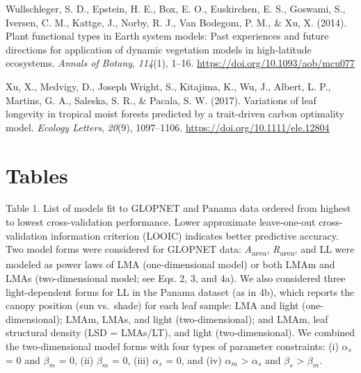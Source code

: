 \documentclass[
  12pt,
  letterpaper,
  DIV=11,
  numbers=noendperiod]{scrartcl}
\newlength{\cslhangindent}
\newlength{\cslentryspacingunit} %
\newenvironment{CSLReferences}[2] %
 {%
  \setlength{\parindent}{0pt}
  \ifodd #1
  \let\oldpar\par
  \def\par{\hangindent=\cslhangindent\oldpar}
  \fi
  \setlength{\parskip}{#2\cslentryspacingunit}
 }%
 {}
\begin{document}
\begin{CSLReferences}{1}{0}
\leavevmode{}%
Wullschleger, S. D., Epstein, H. E., Box, E. O., Euskirchen, E. S.,
Goswami, S., Iversen, C. M., Kattge, J., Norby, R. J., Van Bodegom, P.
M., \& Xu, X. (2014). Plant functional types in {Earth} system models:
{Past} experiences and future directions for application of dynamic
vegetation models in high-latitude ecosystems. \emph{Annals of Botany},
\emph{114}(1), 1--16. \url{https://doi.org/10.1093/aob/mcu077}

\leavevmode{}%
Xu, X., Medvigy, D., Joseph Wright, S., Kitajima, K., Wu, J., Albert, L.
P., Martins, G. A., Saleska, S. R., \& Pacala, S. W. (2017). Variations
of leaf longevity in tropical moist forests predicted by a trait-driven
carbon optimality model. \emph{Ecology Letters}, \emph{20}(9),
1097--1106. \url{https://doi.org/10.1111/ele.12804}

\end{CSLReferences}

\newpage

\hypertarget{tables}{%
\section{Tables}\label{tables}}

Table 1. List of models fit to GLOPNET and Panama data ordered from
highest to lowest cross-validation performance. Lower approximate
leave-one-out cross-validation information criterion (LOOIC) indicates
better predictive accuracy. Two model forms were considered for GLOPNET
data: \emph{A}\textsubscript{area}, \emph{R}\textsubscript{area}, and LL
were modeled as power laws of LMA (one-dimensional model) or both LMAm
and LMAs (two-dimensional model; see Eqs. 2, 3, and 4a). We also
considered three light-dependent forms for LL in the Panama dataset (as
in 4b), which reports the canopy position (sun vs.~shade) for each leaf
sample: LMA and light (one-dimensional); LMAm, LMAs, and light
(two-dimensional); and LMAm, leaf structural density (LSD = LMAs/LT),
and light (two-dimensional). We combined the two-dimensional model forms
with four types of parameter constraints: (i) \(\alpha_s\) = 0 and
\(\beta_m\) = 0, (ii) \(\beta_m\) = 0, (iii) \(\alpha_s\) = 0, and (iv)
\(\alpha_m\) \textgreater{} \(\alpha_s\) and \(\beta_s\) \textgreater{}
\(\beta_m\).
\end{document}
